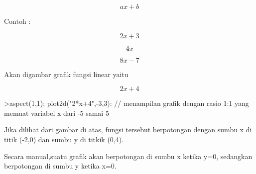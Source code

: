 \documentclass{article}
\begin{document}
\begin{eulernotebook}
\begin{eulercomment}
\begin{eulercomment}
\begin{eulercomment}
\begin{eulercomment}
\begin{eulercomment}
\begin{eulercomment}
\begin{eulercomment}
\end{eulercomment}
\begin{eulerformula}
\[
ax+b
\]
\end{eulerformula}
\begin{eulercomment}
Contoh :\\
\end{eulercomment}
\begin{eulerformula}
\[
2x+3
\]
\end{eulerformula}
\begin{eulerformula}
\[
4x
\]
\end{eulerformula}
\begin{eulerformula}
\[
8x-7
\]
\end{eulerformula}
\begin{eulercomment}
Akan digambar grafik fungsi linear yaitu\\
\end{eulercomment}
\begin{eulerformula}
\[
2x+4
\]
\end{eulerformula}
\begin{eulerprompt}
>aspect(1,1); plot2d("2*x+4",-3,3): // menampilan grafik dengan rasio 1:1 yang memuat variabel x dari -5 samai 5
\end{eulerprompt}
\begin{eulercomment}
Jika dilihat dari gambar  di atas, fungsi tersebut berpotongan dengan
sumbu x di titik (-2,0) dan sumbu y di titkik (0,4).

Secara manual,suatu grafik akan berpotongan di sumbu x ketika y=0,
sedangkan berpotongan di sumbu y ketika x=0.


\end{eulercomment}
\end{eulercomment}
\end{eulercomment}
\end{eulercomment}
\end{eulercomment}
\end{eulercomment}
\end{eulercomment}
\end{eulernotebook}
\end{document}
